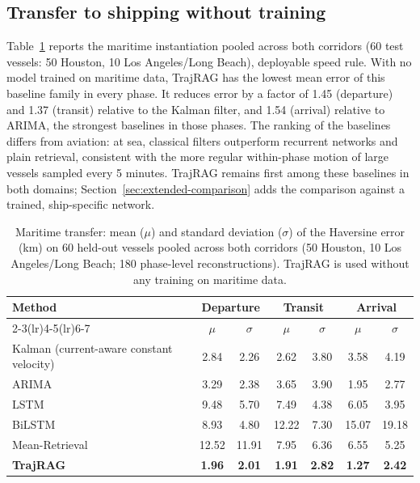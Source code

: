 \subsection{Transfer to shipping without training}

Table~\ref{tab:maritime-transfer} reports the maritime instantiation pooled
across both corridors (60 test vessels: 50 Houston, 10 Los Angeles/Long
Beach), deployable speed rule. With no model trained on maritime data,
TrajRAG has the lowest mean error of this baseline family in every phase.
It reduces error by a factor of 1.45 (departure) and 1.37 (transit) relative
to the Kalman filter, and 1.54 (arrival) relative to ARIMA, the strongest
baselines in those phases. The ranking of the baselines differs from
aviation: at sea, classical filters outperform recurrent networks and plain
retrieval, consistent with the more regular within-phase motion of large
vessels sampled every 5 minutes. TrajRAG remains first among these
baselines in both domains; Section~\ref{sec:extended-comparison} adds the
comparison against a trained, ship-specific network.

\begin{table}[t]
\centering
\caption{Maritime transfer: mean ($\mu$) and standard deviation ($\sigma$)
of the Haversine error (km) on 60 held-out vessels pooled across both
corridors (50 Houston, 10 Los Angeles/Long Beach; 180 phase-level
reconstructions). TrajRAG is used without any training on maritime data.}
\label{tab:maritime-transfer}
\footnotesize
\setlength{\tabcolsep}{4pt}
\begin{tabular}{lcccccc}
\toprule
\multirow{2}{*}{Method} & \multicolumn{2}{c}{Departure} & \multicolumn{2}{c}{Transit} & \multicolumn{2}{c}{Arrival} \\
\cmidrule(lr){2-3}\cmidrule(lr){4-5}\cmidrule(lr){6-7}
 & $\mu$ & $\sigma$ & $\mu$ & $\sigma$ & $\mu$ & $\sigma$ \\
\midrule
Kalman (current-aware constant velocity) & 2.84 & 2.26 & 2.62 & 3.80 & 3.58 & 4.19 \\
ARIMA & 3.29 & 2.38 & 3.65 & 3.90 & 1.95 & 2.77 \\
LSTM & 9.48 & 5.70 & 7.49 & 4.38 & 6.05 & 3.95 \\
BiLSTM & 8.93 & 4.80 & 12.22 & 7.30 & 15.07 & 19.18 \\
Mean-Retrieval & 12.52 & 11.91 & 7.95 & 6.36 & 6.55 & 5.25 \\
\textbf{TrajRAG} & \textbf{1.96} & \textbf{2.01} & \textbf{1.91} & \textbf{2.82} & \textbf{1.27} & \textbf{2.42} \\
\bottomrule
\end{tabular}
\end{table}

